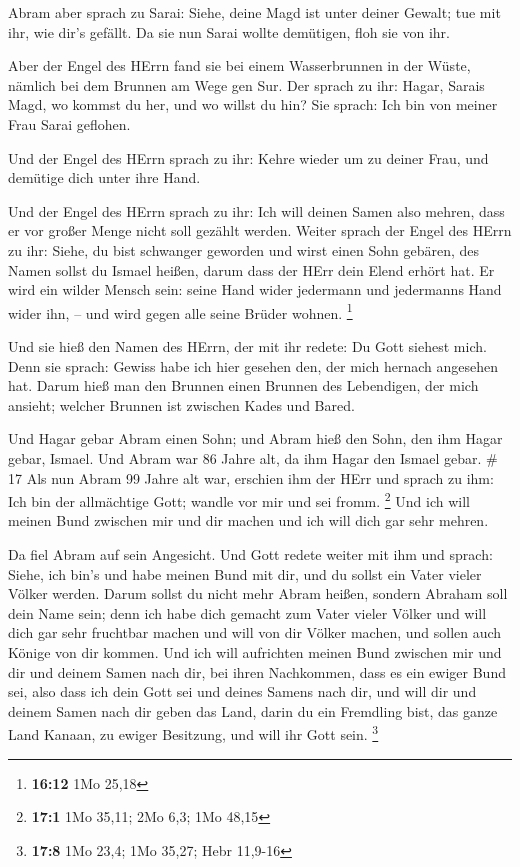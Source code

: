  Abram aber sprach zu Sarai: Siehe, deine Magd ist unter
deiner Gewalt; tue mit ihr, wie dir's gefällt. Da sie nun Sarai wollte
demütigen, floh sie von ihr.

 Aber der Engel des HErrn fand sie bei einem Wasserbrunnen
in der Wüste, nämlich bei dem Brunnen am Wege gen Sur.  Der
sprach zu ihr: Hagar, Sarais Magd, wo kommst du her, und wo willst du
hin? Sie sprach: Ich bin von meiner Frau Sarai geflohen.

 Und der Engel des HErrn sprach zu ihr: Kehre wieder um zu
deiner Frau, und demütige dich unter ihre Hand.

 Und der Engel des HErrn sprach zu ihr: Ich will deinen
Samen also mehren, dass er vor großer Menge nicht soll gezählt werden.
 Weiter sprach der Engel des HErrn zu ihr: Siehe, du bist
schwanger geworden und wirst einen Sohn gebären, des Namen sollst du
Ismael heißen, darum dass der HErr dein Elend erhört hat. 
Er wird ein wilder Mensch sein: seine Hand wider jedermann und
jedermanns Hand wider ihn, -- und wird gegen alle seine Brüder wohnen.
\footnote{\textbf{16:12} 1Mo 25,18}

 Und sie hieß den Namen des HErrn, der mit ihr redete: Du
Gott siehest mich. Denn sie sprach: Gewiss habe ich hier gesehen den,
der mich hernach angesehen hat.  Darum hieß man den Brunnen
einen Brunnen des Lebendigen, der mich ansieht; welcher Brunnen ist
zwischen Kades und Bared.

 Und Hagar gebar Abram einen Sohn; und Abram hieß den Sohn,
den ihm Hagar gebar, Ismael.  Und Abram war 86 Jahre alt,
da ihm Hagar den Ismael gebar. \# 17  Als nun Abram 99 Jahre
alt war, erschien ihm der HErr und sprach zu ihm: Ich bin der
allmächtige Gott; wandle vor mir und sei fromm. \footnote{\textbf{17:1}
  1Mo 35,11; 2Mo 6,3; 1Mo 48,15}  Und ich will meinen Bund
zwischen mir und dir machen und ich will dich gar sehr mehren.

 Da fiel Abram auf sein Angesicht. Und Gott redete weiter
mit ihm und sprach:  Siehe, ich bin's und habe meinen Bund
mit dir, und du sollst ein Vater vieler Völker werden. 
Darum sollst du nicht mehr Abram heißen, sondern Abraham soll dein Name
sein; denn ich habe dich gemacht zum Vater vieler Völker 
und will dich gar sehr fruchtbar machen und will von dir Völker machen,
und sollen auch Könige von dir kommen.  Und ich will
aufrichten meinen Bund zwischen mir und dir und deinem Samen nach dir,
bei ihren Nachkommen, dass es ein ewiger Bund sei, also dass ich dein
Gott sei und deines Samens nach dir,  und will dir und
deinem Samen nach dir geben das Land, darin du ein Fremdling bist, das
ganze Land Kanaan, zu ewiger Besitzung, und will ihr Gott sein.
\footnote{\textbf{17:8} 1Mo 23,4; 1Mo 35,27; Hebr 11,9-16}

